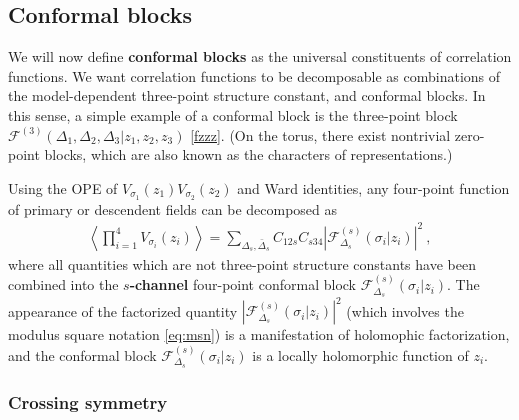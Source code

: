 \documentclass[12pt, a4paper, notitlepage, twoside]{report}
\numberwithin{equation}{section}
\theoremstyle{break}
\begin{document}
\subsection{Conformal blocks \label{secaco}}

We will now define \textbf{\boldmath conformal blocks} as the universal constituents of correlation functions. 
We want correlation functions to be decomposable as combinations of the model-dependent three-point structure constant, and conformal blocks.
In this sense, a simple example of a conformal block is the three-point block $\mathcal{F}^{(3)}(\Delta_1,\Delta_2,\Delta_3|z_1,z_2,z_3)$ \eqref{fzzz}. (On the torus, there exist nontrivial zero-point blocks, which are also known as the characters of representations.)

Using the OPE of $V_{\sigma_1}(z_1)V_{\sigma_2}(z_2)$ and Ward identities, any four-point function of primary or descendent fields can be decomposed as 
\begin{align}
 \left\langle \prod_{i=1}^4 V_{\sigma_i}(z_i)\right\rangle 
 = \sum_{\Delta_s,\bar{\Delta}_s} C_{12s} C_{s34} \left| \mathcal{F}^{(s)}_{\Delta_s}(\sigma_i|z_i)\right|^2\ ,
\label{fsd}
\end{align}
where all quantities which are not three-point structure constants have been combined into the \textbf{\boldmath $s$-channel} four-point conformal block $\mathcal{F}^{(s)}_{\Delta_s}(\sigma_i|z_i)$.
The appearance of the factorized quantity $\left| \mathcal{F}^{(s)}_{\Delta_s}(\sigma_i|z_i)\right|^2$ (which involves the modulus square notation \eqref{eq:msn}) is a manifestation of holomophic factorization, and the conformal block $\mathcal{F}^{(s)}_{\Delta_s}(\sigma_i|z_i)$ is a locally holomorphic function of $z_i$. 

\subsubsection{Crossing symmetry}
\end{document}
